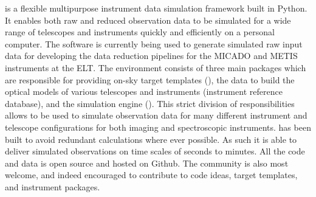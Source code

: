 
\ScopeSim{} is a flexible multipurpose instrument data simulation framework built in Python.
It enables both raw and reduced observation data to be simulated for a wide range of telescopes and instruments quickly and efficiently on a personal computer.
The software is currently being used to generate simulated raw input data for developing the data reduction pipelines for the MICADO and METIS instruments at the ELT.
The \ScopeSim{} environment consists of three main packages which are responsible for providing on-sky target templates (\ScopeSimtemplates{}), the data to build the optical models of various telescopes and instruments (instrument reference database), and the simulation engine (\ScopeSim{}).
This strict division of responsibilities allows \ScopeSim{} to be used to simulate observation data for many different instrument and telescope configurations for both imaging and spectroscopic instruments.
\ScopeSim{} has been built to avoid redundant calculations where ever possible.
As such it is able to deliver simulated observations on time scales of seconds to minutes.
All the code and data is open source and hosted on Github.
The community is also most welcome, and indeed encouraged to contribute to code ideas, target templates, and instrument packages.

